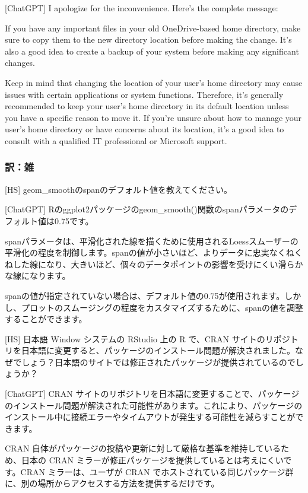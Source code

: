 \documentclass[
]{bxjsbook}
\theoremstyle{definition}
\theoremstyle{definition}
\theoremstyle{definition}
\theoremstyle{definition}
\theoremstyle{remark}
\begin{document}
{[}ChatGPT{]} I apologize for the inconvenience. Here's the complete message:

If you have any important files in your old OneDrive-based home directory, make sure to copy them to the new directory location before making the change. It's also a good idea to create a backup of your system before making any significant changes.

Keep in mind that changing the location of your user's home directory may cause issues with certain applications or system functions. Therefore, it's generally recommended to keep your user's home directory in its default location unless you have a specific reason to move it. If you're unsure about how to manage your user's home directory or have concerns about its location, it's a good idea to consult with a qualified IT professional or Microsoft support.

\hypertarget{miscellanousj}{%
\subsubsection{訳：雑}\label{miscellanousj}}

{[}HS{]} geom\_smoothのspanのデフォルト値を教えてください。

{[}ChatGPT{]} Rのggplot2パッケージのgeom\_smooth()関数のspanパラメータのデフォルト値は0.75です。

spanパラメータは、平滑化された線を描くために使用されるLoessスムーザーの平滑化の程度を制御します。spanの値が小さいほど、よりデータに忠実なくねくねした線になり、大きいほど、個々のデータポイントの影響を受けにくい滑らかな線になります。

spanの値が指定されていない場合は、デフォルト値の0.75が使用されます。しかし、プロットのスムージングの程度をカスタマイズするために、spanの値を調整することができます。

{[}HS{]} 日本語 Window システムの RStudio 上の R で、CRAN サイトのリポジトリを日本語に変更すると、パッケージのインストール問題が解決されました。なぜでしょう？日本語のサイトでは修正されたパッケージが提供されているのでしょうか？

{[}ChatGPT{]} CRAN サイトのリポジトリを日本語に変更することで、パッケージのインストール問題が解決された可能性があります。これにより、パッケージのインストール中に接続エラーやタイムアウトが発生する可能性を減らすことができます。

CRAN 自体がパッケージの投稿や更新に対して厳格な基準を維持しているため、日本の CRAN ミラーが修正パッケージを提供しているとは考えにくいです。CRAN ミラーは、ユーザが CRAN でホストされている同じパッケージ群に、別の場所からアクセスする方法を提供するだけです。
\end{document}
